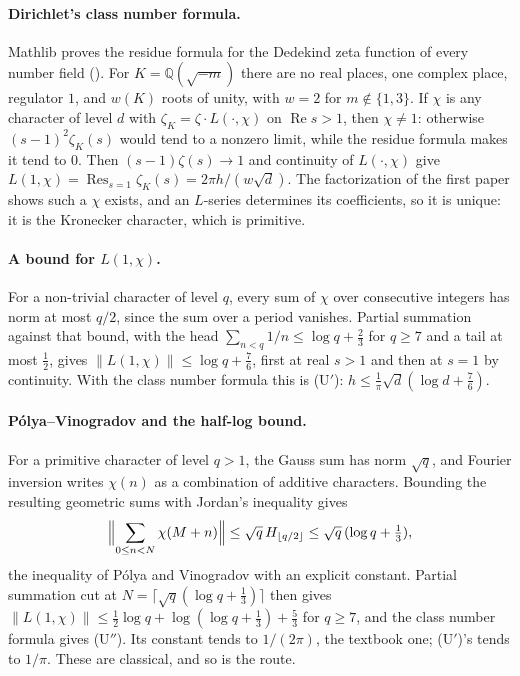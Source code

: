 \documentclass[11pt]{article}
\theoremstyle{definition}
\newcommand{\re}{\operatorname{Re}}
\newcommand{\Q}{\mathbb{Q}}
\begin{document}
\paragraph{Dirichlet's class number formula.} Mathlib proves the residue formula for the Dedekind zeta function of every number field (). For $K = \Q(\sqrt{-m})$ there are no real places, one complex place, regulator $1$, and $w(K)$ roots of unity, with $w = 2$ for $m \notin \{1, 3\}$. If $\chi$ is any character of level $d$ with $\zeta_K = \zeta\cdot L(\cdot,\chi)$ on $\re s > 1$, then $\chi \ne 1$: otherwise $(s-1)^2\zeta_K(s)$ would tend to a nonzero limit, while the residue formula makes it tend to $0$. Then $(s-1)\zeta(s) \to 1$ and continuity of $L(\cdot,\chi)$ give $L(1,\chi) = \operatorname{Res}_{s=1}\zeta_K(s) = 2\pi h/(w\sqrt d)$. The factorization of the first paper shows such a $\chi$ exists, and an $L$-series determines its coefficients, so it is unique: it is the Kronecker character, which is primitive.

\paragraph{A bound for $L(1,\chi)$.} For a non-trivial character of level $q$, every sum of $\chi$ over consecutive integers has norm at most $q/2$, since the sum over a period vanishes. Partial summation against that bound, with the head $\sum_{n < q} 1/n \le \log q + \frac23$ for $q \ge 7$ and a tail at most $\frac12$, gives $\|L(1,\chi)\| \le \log q + \frac76$, first at real $s > 1$ and then at $s = 1$ by continuity. With the class number formula this is (U$'$): $h \le \frac1\pi\sqrt d(\log d + \frac76)$.

\paragraph{Pólya--Vinogradov and the half-log bound.} For a primitive character of level $q > 1$, the Gauss sum has norm $\sqrt q$, and Fourier inversion writes $\chi(n)$ as a combination of additive characters. Bounding the resulting geometric sums with Jordan's inequality gives
\[
\Bigl\|\sum_{0 \le n < N}\chi(M + n)\Bigr\| \le \sqrt q\,H_{\lfloor q/2\rfloor} \le \sqrt q\,(\log q + \tfrac13),
\]
the inequality of Pólya and Vinogradov \cite{Polya1918,Vinogradov1918} with an explicit constant. Partial summation cut at $N = \lceil\sqrt q(\log q + \frac13)\rceil$ then gives $\|L(1,\chi)\| \le \frac12\log q + \log(\log q + \frac13) + \frac53$ for $q \ge 7$, and the class number formula gives (U$''$). Its constant tends to $1/(2\pi)$, the textbook one; (U$'$)'s tends to $1/\pi$. These are classical, and so is the route.
\end{document}
